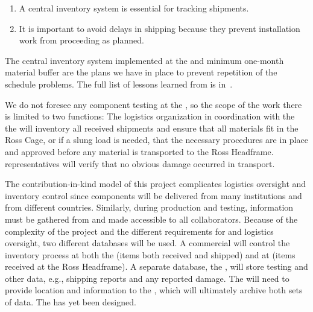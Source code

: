 \begin{enumerate}
\item A central inventory system is essential for tracking  shipments.
\item It is important to avoid delays in shipping because they prevent installation work from  proceeding as planned. 
\end{enumerate}

The central inventory system  implemented at the   and minimum one-month material buffer are the plans we have in place to prevent repetition of the  schedule problems. %
The full list of lessons learned from  is in~\cite{bib:docdb8255}. 

We do not foresee any component testing at the , so the scope of the  work there is limited to two functions: 
The  logistics organization in coordination with the %
the  will inventory all received shipments and  ensure that all materials fit in the Ross Cage, or if a slung load is needed, that the necessary procedures are in place and approved before any material is transported to the Ross Headframe.  
 representatives will verify that no obvious damage occurred in transport. 

The contribution-in-kind model of this project complicates logistics oversight and inventory control %
since components will be delivered from many institutions and from different countries. 
Similarly, during production and testing,  information must be gathered from and made accessible to all collaborators. 
Because of the complexity of the project and the different requirements for  and logistics oversight, two different databases will be used. %
A commercial  will control the inventory process at both the  (items both received and shipped) and at  (items received at the Ross Headframe). A  separate database, the , will %
store testing and other  data, e.g.,  shipping reports and any reported damage. 
The  will need to provide location and   information to the , which will ultimately archive %
both sets of data. The  has yet been designed.

